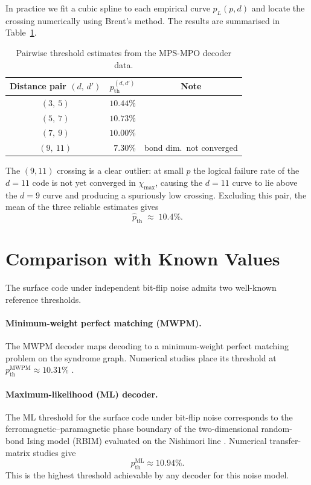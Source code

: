 \documentclass[11pt, a4paper]{article}
\begin{document}
In practice we fit a cubic spline to each empirical curve $p_L(p, d)$ and
locate the crossing numerically using Brent's method.
The results are summarised in Table~\ref{tab:crossings}.

\begin{table}[h]
    \centering
    \caption{Pairwise threshold estimates from the MPS-MPO decoder data.}
    \label{tab:crossings}
    \begin{tabular}{ccc}
        \toprule
        Distance pair $(d,\, d')$ & $p_{\mathrm{th}}^{(d,d')}$ & Note \\
        \midrule
        $(3,\ 5)$  & $10.44\%$ & \\
        $(5,\ 7)$  & $10.73\%$ & \\
        $(7,\ 9)$  & $10.00\%$ & \\
        $(9,\ 11)$ & $\phantom{0}7.30\%$ & bond dim.\ not converged \\
        \bottomrule
    \end{tabular}
\end{table}

The $(9, 11)$ crossing is a clear outlier: at small $p$ the logical failure
rate of the $d = 11$ code is not yet converged in $\chi_{\max}$, causing the
$d = 11$ curve to lie above the $d = 9$ curve and producing a spuriously
low crossing.  Excluding this pair, the mean of the three reliable estimates
gives
\begin{equation}
    \hat{p}_{\mathrm{th}} \;\approx\; 10.4\%.
\end{equation}

\section{Comparison with Known Values}

The surface code under independent bit-flip noise admits two well-known
reference thresholds.

\paragraph{Minimum-weight perfect matching (MWPM).}
The MWPM decoder maps decoding to a minimum-weight perfect matching problem
on the syndrome graph.  Numerical studies place its threshold at
$p_{\mathrm{th}}^{\mathrm{MWPM}} \approx 10.31\%$
\cite{dennis2002topological}.

\paragraph{Maximum-likelihood (ML) decoder.}
The ML threshold for the surface code under bit-flip noise corresponds to the
ferromagnetic--paramagnetic phase boundary of the two-dimensional random-bond
Ising model (RBIM) evaluated on the Nishimori line \cite{dennis2002topological,
wang2003confinement}.  Numerical transfer-matrix studies give
\begin{equation}
    p_{\mathrm{th}}^{\mathrm{ML}} \approx 10.94\%.
\end{equation}
This is the highest threshold achievable by any decoder for this noise model.
\end{document}
